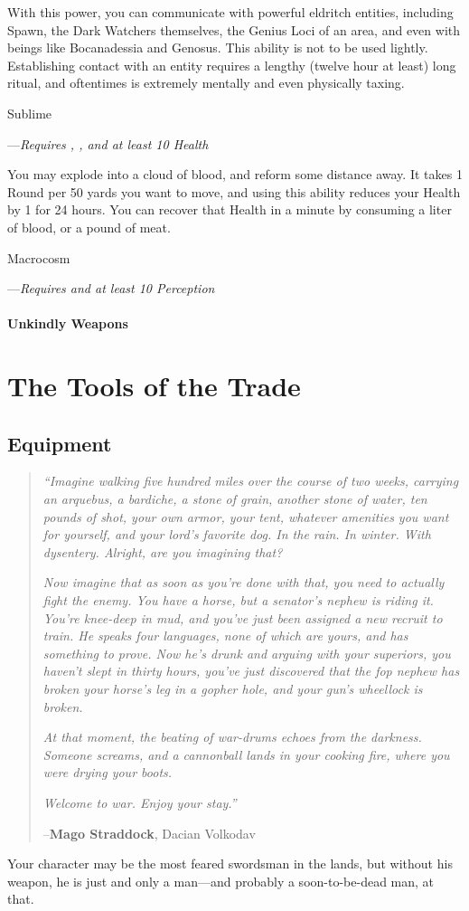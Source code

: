 \documentclass[oneside,11pt,english]{book}
\begin{document}
With this power, you can communicate 
with powerful eldritch entities, including Spawn, the Dark Watchers themselves, the Genius Loci 
of an area, and even with beings like Bocanadessia and Genosus. 
This ability is not to be used lightly. Establishing contact with an entity requires a lengthy (twelve 
hour at least) long ritual, and oftentimes is extremely mentally and even physically taxing.

\subparagraph{Sublime}\label{honor:Sublime}
---\quad \emph{Requires , , and at least 10 Health}

You may explode into a cloud 
of blood, and reform some distance away. It takes 1 Round per 50 yards you want to move, and 
using this ability reduces your Health by 1 for 24 hours. You can recover that Health in a minute 
by consuming a liter of blood, or a pound of meat. 

\subparagraph{Macrocosm}\label{honor:Macrocosm}
---\quad \emph{Requires  and at least 10 Perception}

\subsection{Unkindly Weapons}

\part{The Tools of the Trade}
\chapter{Equipment}\label{ch:equipment}
\startcontents[chapters]
\clearpage
\begin{quotation}
	\emph{“Imagine walking five hundred miles over the course of two weeks, carrying an arquebus, a bardiche, a stone of grain, another stone of water, ten pounds of shot, your own armor, your tent, whatever amenities you want for yourself, and your lord’s favorite dog. In the rain. In winter. With dysentery. Alright, are you imagining that?}

	\emph{Now imagine that as soon as you’re done with that, you need to actually fight the enemy. You have a horse, but a senator’s nephew is riding it. You’re knee-deep in mud, and you’ve just been assigned a new recruit to train. He speaks four languages, none of which are yours, and has something to prove. Now he’s drunk and arguing with your superiors, you haven’t slept in thirty hours, you’ve just discovered that the fop nephew has broken your horse’s leg in a gopher hole, and your gun’s wheellock is broken.}

	\emph{At that moment, the beating of war-drums echoes from the darkness. Someone screams, and a cannonball lands in your cooking fire, where you were drying your boots.}
		
	\emph{Welcome to war. Enjoy your stay.”}

		\hfill--\textbf{Mago Straddock}, Dacian Volkodav
\end{quotation}
Your character may be the most feared swordsman in the lands, but without his weapon, he is just and 
only a man—and probably a soon-to-be-dead man, at that. 
\end{document}
